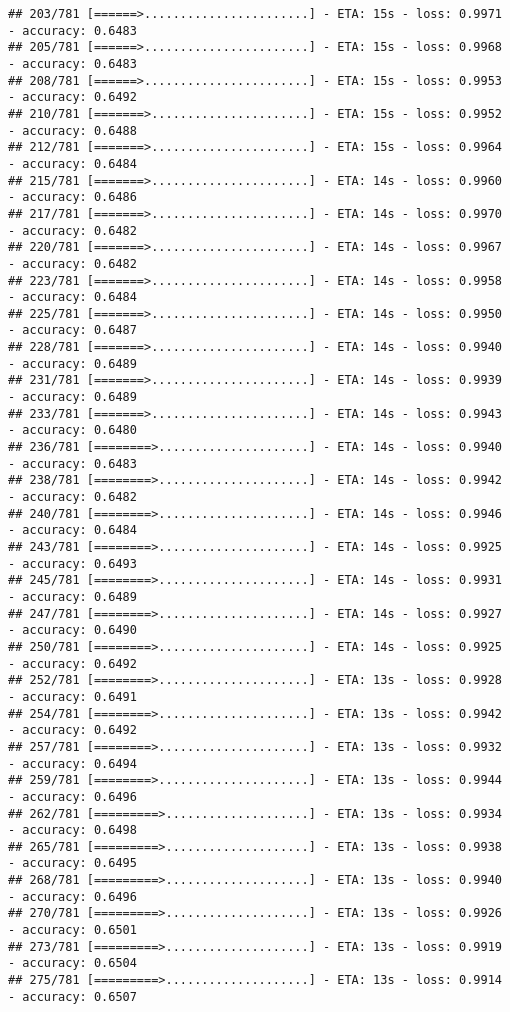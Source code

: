 \documentclass[
]{article}
\begin{document}
\begin{verbatim}
## 203/781 [======>.......................] - ETA: 15s - loss: 0.9971 - accuracy: 0.6483
## 205/781 [======>.......................] - ETA: 15s - loss: 0.9968 - accuracy: 0.6483
## 208/781 [======>.......................] - ETA: 15s - loss: 0.9953 - accuracy: 0.6492
## 210/781 [=======>......................] - ETA: 15s - loss: 0.9952 - accuracy: 0.6488
## 212/781 [=======>......................] - ETA: 15s - loss: 0.9964 - accuracy: 0.6484
## 215/781 [=======>......................] - ETA: 14s - loss: 0.9960 - accuracy: 0.6486
## 217/781 [=======>......................] - ETA: 14s - loss: 0.9970 - accuracy: 0.6482
## 220/781 [=======>......................] - ETA: 14s - loss: 0.9967 - accuracy: 0.6482
## 223/781 [=======>......................] - ETA: 14s - loss: 0.9958 - accuracy: 0.6484
## 225/781 [=======>......................] - ETA: 14s - loss: 0.9950 - accuracy: 0.6487
## 228/781 [=======>......................] - ETA: 14s - loss: 0.9940 - accuracy: 0.6489
## 231/781 [=======>......................] - ETA: 14s - loss: 0.9939 - accuracy: 0.6489
## 233/781 [=======>......................] - ETA: 14s - loss: 0.9943 - accuracy: 0.6480
## 236/781 [========>.....................] - ETA: 14s - loss: 0.9940 - accuracy: 0.6483
## 238/781 [========>.....................] - ETA: 14s - loss: 0.9942 - accuracy: 0.6482
## 240/781 [========>.....................] - ETA: 14s - loss: 0.9946 - accuracy: 0.6484
## 243/781 [========>.....................] - ETA: 14s - loss: 0.9925 - accuracy: 0.6493
## 245/781 [========>.....................] - ETA: 14s - loss: 0.9931 - accuracy: 0.6489
## 247/781 [========>.....................] - ETA: 14s - loss: 0.9927 - accuracy: 0.6490
## 250/781 [========>.....................] - ETA: 14s - loss: 0.9925 - accuracy: 0.6492
## 252/781 [========>.....................] - ETA: 13s - loss: 0.9928 - accuracy: 0.6491
## 254/781 [========>.....................] - ETA: 13s - loss: 0.9942 - accuracy: 0.6492
## 257/781 [========>.....................] - ETA: 13s - loss: 0.9932 - accuracy: 0.6494
## 259/781 [========>.....................] - ETA: 13s - loss: 0.9944 - accuracy: 0.6496
## 262/781 [=========>....................] - ETA: 13s - loss: 0.9934 - accuracy: 0.6498
## 265/781 [=========>....................] - ETA: 13s - loss: 0.9938 - accuracy: 0.6495
## 268/781 [=========>....................] - ETA: 13s - loss: 0.9940 - accuracy: 0.6496
## 270/781 [=========>....................] - ETA: 13s - loss: 0.9926 - accuracy: 0.6501
## 273/781 [=========>....................] - ETA: 13s - loss: 0.9919 - accuracy: 0.6504
## 275/781 [=========>....................] - ETA: 13s - loss: 0.9914 - accuracy: 0.6507

\end{verbatim}
\end{document}
